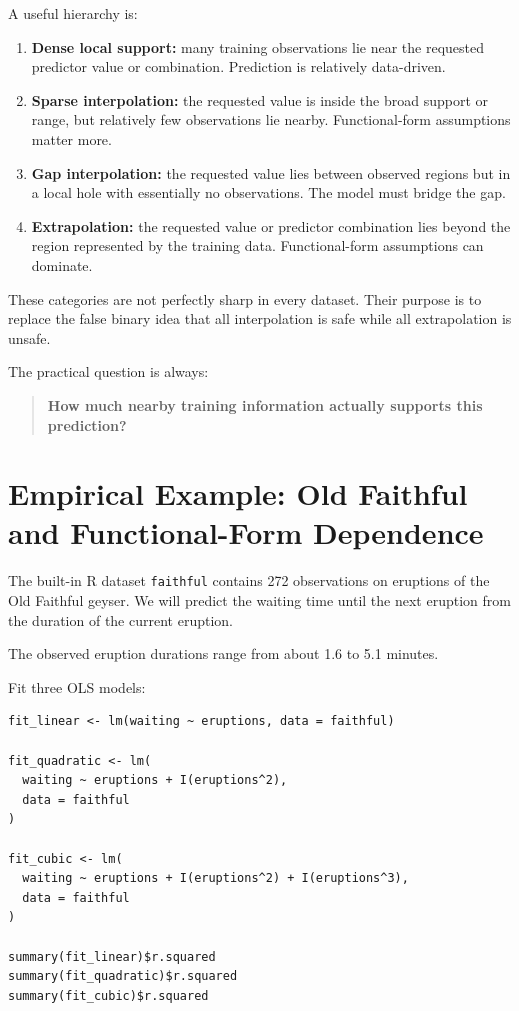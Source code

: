 \documentclass[11pt]{report}
\begin{document}
A useful hierarchy is:

\begin{enumerate}
    \item \textbf{Dense local support:} many training observations lie near the requested predictor value or combination. Prediction is relatively data-driven.
    \item \textbf{Sparse interpolation:} the requested value is inside the broad support or range, but relatively few observations lie nearby. Functional-form assumptions matter more.
    \item \textbf{Gap interpolation:} the requested value lies between observed regions but in a local hole with essentially no observations. The model must bridge the gap.
    \item \textbf{Extrapolation:} the requested value or predictor combination lies beyond the region represented by the training data. Functional-form assumptions can dominate.
\end{enumerate}

These categories are not perfectly sharp in every dataset. Their purpose is to replace the false binary idea that all interpolation is safe while all extrapolation is unsafe.

The practical question is always:

\begin{quote}
\textbf{How much nearby training information actually supports this prediction?}
\end{quote}

\section{Empirical Example: Old Faithful and Functional-Form Dependence}

The built-in R dataset \texttt{faithful} contains 272 observations on eruptions of the Old Faithful geyser. We will predict the waiting time until the next eruption from the duration of the current eruption.

The observed eruption durations range from about 1.6 to 5.1 minutes.

Fit three OLS models:

\begin{lstlisting}
fit_linear <- lm(waiting ~ eruptions, data = faithful)

fit_quadratic <- lm(
  waiting ~ eruptions + I(eruptions^2),
  data = faithful
)

fit_cubic <- lm(
  waiting ~ eruptions + I(eruptions^2) + I(eruptions^3),
  data = faithful
)

summary(fit_linear)$r.squared
summary(fit_quadratic)$r.squared
summary(fit_cubic)$r.squared
\end{lstlisting}
\end{document}

